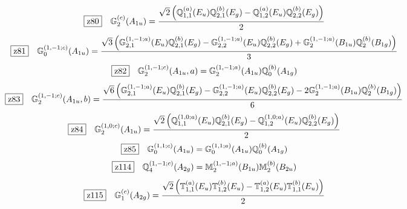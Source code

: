 \documentclass[fleqn,10pt,landscape]{jsarticle}
\begin{document}
\begin{dmath*}
\hspace*{3mm}\fbox{z80}\quad \mathbb{G}_{2}^{(c)}(A_{1u})=\frac{\sqrt{2} \left(\mathbb{Q}_{1,1}^{(a)}(E_{u}) \mathbb{Q}_{2,1}^{(b)}(E_{g}) - \mathbb{Q}_{1,2}^{(a)}(E_{u}) \mathbb{Q}_{2,2}^{(b)}(E_{g})\right)}{2}
\end{dmath*}
\begin{dmath*}
\hspace*{3mm}\fbox{z81}\quad \mathbb{G}_{0}^{(1,-1;c)}(A_{1u})=\frac{\sqrt{3} \left(\mathbb{G}_{2,1}^{(1,-1;a)}(E_{u}) \mathbb{Q}_{2,1}^{(b)}(E_{g}) - \mathbb{G}_{2,2}^{(1,-1;a)}(E_{u}) \mathbb{Q}_{2,2}^{(b)}(E_{g}) + \mathbb{G}_{2}^{(1,-1;a)}(B_{1u}) \mathbb{Q}_{2}^{(b)}(B_{1g})\right)}{3}
\end{dmath*}
\begin{dmath*}
\hspace*{3mm}\fbox{z82}\quad \mathbb{G}_{2}^{(1,-1;c)}(A_{1u},a)=\mathbb{G}_{2}^{(1,-1;a)}(A_{1u}) \mathbb{Q}_{0}^{(b)}(A_{1g})
\end{dmath*}
\begin{dmath*}
\hspace*{3mm}\fbox{z83}\quad \mathbb{G}_{2}^{(1,-1;c)}(A_{1u},b)=\frac{\sqrt{6} \left(\mathbb{G}_{2,1}^{(1,-1;a)}(E_{u}) \mathbb{Q}_{2,1}^{(b)}(E_{g}) - \mathbb{G}_{2,2}^{(1,-1;a)}(E_{u}) \mathbb{Q}_{2,2}^{(b)}(E_{g}) - 2 \mathbb{G}_{2}^{(1,-1;a)}(B_{1u}) \mathbb{Q}_{2}^{(b)}(B_{1g})\right)}{6}
\end{dmath*}
\begin{dmath*}
\hspace*{3mm}\fbox{z84}\quad \mathbb{G}_{2}^{(1,0;c)}(A_{1u})=\frac{\sqrt{2} \left(\mathbb{Q}_{1,1}^{(1,0;a)}(E_{u}) \mathbb{Q}_{2,1}^{(b)}(E_{g}) - \mathbb{Q}_{1,2}^{(1,0;a)}(E_{u}) \mathbb{Q}_{2,2}^{(b)}(E_{g})\right)}{2}
\end{dmath*}
\begin{dmath*}
\hspace*{3mm}\fbox{z85}\quad \mathbb{G}_{0}^{(1,1;c)}(A_{1u})=\mathbb{G}_{0}^{(1,1;a)}(A_{1u}) \mathbb{Q}_{0}^{(b)}(A_{1g})
\end{dmath*}
\begin{dmath*}
\hspace*{3mm}\fbox{z114}\quad \mathbb{Q}_{4}^{(1,-1;c)}(A_{2g})=\mathbb{M}_{2}^{(1,-1;a)}(B_{1u}) \mathbb{M}_{2}^{(b)}(B_{2u})
\end{dmath*}
\begin{dmath*}
\hspace*{3mm}\fbox{z115}\quad \mathbb{G}_{1}^{(c)}(A_{2g})=\frac{\sqrt{2} \left(\mathbb{T}_{1,1}^{(a)}(E_{u}) \mathbb{T}_{1,2}^{(b)}(E_{u}) - \mathbb{T}_{1,2}^{(a)}(E_{u}) \mathbb{T}_{1,1}^{(b)}(E_{u})\right)}{2}
\end{dmath*}
\end{document}
